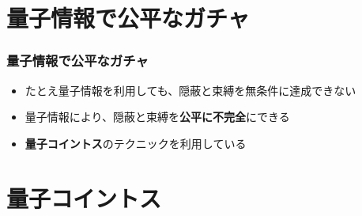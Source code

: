\section{量子情報で公平なガチャ}

\begin{frame}
  \frametitle{量子情報で公平なガチャ}

  \begin{itemize}
    \item<2-> たとえ量子情報を利用しても、隠蔽と束縛を無条件に達成できない
    \item<3-> 量子情報により、隠蔽と束縛を\textbf{公平に不完全}にできる
  \end{itemize}


  \begin{itemize}
    \item<5-> \textbf{量子コイントス}\cite{AMBAINIS2004398,PhysRevA.80.062321}のテクニックを利用している
  \end{itemize}

\end{frame}

\section{量子コイントス}

\renewcommand*{\arraystretch}{1.3}

